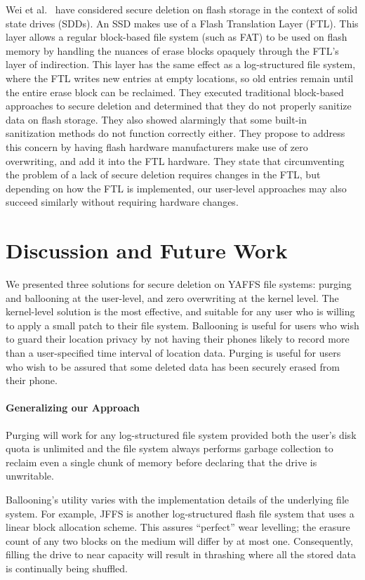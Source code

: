 \documentclass{acmtog}
\begin{document}
Wei et al.~\cite{wei} have considered secure deletion on flash storage in the
context of solid state drives (SDDs). An SSD makes use of a
Flash Translation Layer (FTL). This
layer allows a regular block-based file system (such as FAT) to be used on
flash memory by handling the nuances of erase blocks opaquely through the
FTL's layer of indirection. This layer has the same effect as 
a log-structured file system, where
the FTL writes new entries at empty  locations, so old entries remain
until the entire erase block can be reclaimed. They executed traditional
block-based approaches to secure deletion and determined that they do not
properly sanitize data on flash storage. They also showed alarmingly that some built-in
sanitization methods do not function correctly either. They propose to address
this concern by having 
flash hardware manufacturers make use of zero overwriting, and add it into
the FTL hardware. They state that circumventing the problem of a lack of secure
deletion requires changes in the
FTL, but depending on how the FTL is implemented, our user-level approaches may
also succeed similarly without requiring hardware changes.


\section{Discussion and Future Work}


We presented three solutions for secure deletion on YAFFS file systems:
purging and ballooning at the user-level, and zero overwriting at the kernel level.
The kernel-level solution is the most effective, and suitable for any user who
is willing to apply a small patch to their file system. Ballooning is useful
for users who wish to guard their location privacy by not having their phones
likely to record more than a user-specified time interval of location data. Purging
is useful for users who wish to be assured that some deleted data has been
securely erased from their phone.

\paragraph{Generalizing  our Approach}

Purging will work for any log-structured file system
provided both the user's disk quota is unlimited and the file system always
performs garbage collection to reclaim even a single chunk of
memory before declaring that the drive is
unwritable. 

Ballooning's utility varies with the implementation details
of the underlying file system. 
For example, JFFS is another log-structured flash file system that uses a
linear block allocation scheme. This assures ``perfect'' wear levelling; the
erasure count of any two blocks on the medium will differ by at most
one.  Consequently, filling the drive to near capacity will result in
thrashing  where all the stored data is continually being shuffled.
\end{document}
